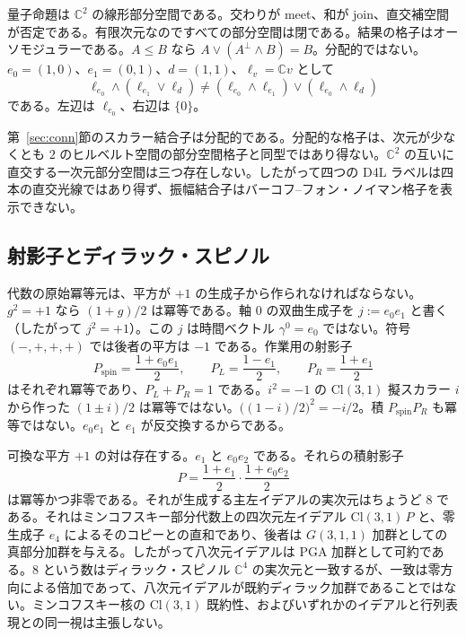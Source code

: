 \documentclass[a4paper]{article}
\theoremstyle{definition}
\begin{document}
量子命題は \(\mathbb{C}^2\) の線形部分空間である。交わりが meet、和が join、直交補空間が否定である。有限次元なのですべての部分空間は閉である。結果の格子はオーソモジュラーである。\(A\le B\) なら \(A\vee(A^\perp\wedge B)=B\)。分配的ではない。\(e_0=(1,0)\)、\(e_1=(0,1)\)、\(d=(1,1)\)、\(\ell_v=\mathbb{C}v\) として
\[
\ell_{e_0}\wedge(\ell_{e_1}\vee\ell_d)
\neq
(\ell_{e_0}\wedge\ell_{e_1})\vee(\ell_{e_0}\wedge\ell_d)
\]
である。左辺は \(\ell_{e_0}\)、右辺は \(\{0\}\)。

第~\ref{sec:conn}節のスカラー結合子は分配的である。分配的な格子は、次元が少なくとも \(2\) のヒルベルト空間の部分空間格子と同型ではあり得ない。\(\mathbb{C}^2\) の互いに直交する一次元部分空間は三つ存在しない。したがって四つの D4L ラベルは四本の直交光線ではあり得ず、振幅結合子はバーコフ--フォン・ノイマン格子を表示できない。

\subsection{射影子とディラック・スピノル}
\label{sec:proj}

代数の原始冪等元は、平方が \(+1\) の生成子から作られなければならない。\(g^2=+1\) なら \((1+g)/2\) は冪等である。軸 \(0\) の双曲生成子を \(j:=e_0e_1\) と書く（したがって \(j^2=+1\)）。この \(j\) は時間ベクトル \(\gamma^0=e_0\) ではない。符号 \((-,+,+,+)\) では後者の平方は \(-1\) である。作業用の射影子
\[
P_{\mathrm{spin}}=\frac{1+e_0e_1}{2},\qquad
P_L=\frac{1-e_1}{2},\qquad
P_R=\frac{1+e_1}{2}
\]
はそれぞれ冪等であり、\(P_L+P_R=1\) である。\(i^2=-1\) の \(\mathrm{Cl}(3,1)\) 擬スカラー \(i\) から作った \((1\pm i)/2\) は冪等ではない。\(\bigl((1-i)/2\bigr)^2=-i/2\)。積 \(P_{\mathrm{spin}}P_R\) も冪等ではない。\(e_0e_1\) と \(e_1\) が反交換するからである。

可換な平方 \(+1\) の対は存在する。\(e_1\) と \(e_0e_2\) である。それらの積射影子
\[
P=\frac{1+e_1}{2}\cdot\frac{1+e_0e_2}{2}
\]
は冪等かつ非零である。それが生成する主左イデアルの実次元はちょうど \(8\) である。それはミンコフスキー部分代数上の四次元左イデアル \(\mathrm{Cl}(3,1)\,P\) と、零生成子 \(e_4\) によるそのコピーとの直和であり、後者は \(G(3,1,1)\) 加群としての真部分加群を与える。したがって八次元イデアルは PGA 加群として可約である。\(8\) という数はディラック・スピノル \(\mathbb{C}^4\) の実次元と一致するが、一致は零方向による倍加であって、八次元イデアルが既約ディラック加群であることではない。ミンコフスキー核の \(\mathrm{Cl}(3,1)\) 既約性、およびいずれかのイデアルと行列表現との同一視は主張しない。
\end{document}
